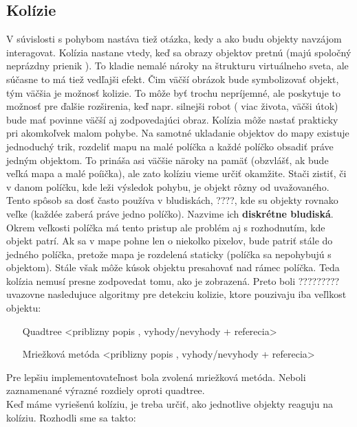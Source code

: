 \subsection{Kolízie}
V súvislosti s pohybom nastáva tiež otázka, kedy a ako budu objekty navzájom interagovat. Kolízia nastane vtedy, keď sa obrazy objektov pretnú (majú spoločný neprázdny prienik ). To kladie nemalé nároky na štrukturu virtuálneho sveta, ale súčasne  to má tiež vedľajši efekt. Čim väčší obrázok bude symbolizovať objekt, tým väčšia je možnosť kolizie. To môže byť trochu nepríjemné, ale poskytuje to možnosť pre ďalšie rozširenia, keď napr. silnejši robot ( viac života, väčši útok) bude mať povinne väčší aj zodpovedajúci obraz. Kolízia môže nastať prakticky pri akomkoľvek malom pohybe. Na samotné ukladanie objektov do mapy existuje jednoduchý trik, rozdeliť mapu na malé políčka a každé políčko obsadiť práve jedným objektom. To prináša asi väčšie näroky na pamäť (obzvlášť, ak bude veľká mapa a malé poíička), ale zato kolíziu vieme určiť okamžite. Stači zistiť, či v danom políčku, kde leži výsledok pohybu, je objekt rôzny od uvažovaného. Tento spôsob sa dosť často používa v bludiskách, %
????, kde su objekty rovnako veľke (každée zaberá práve jedno políčko). Nazvime ich {\bf diskrétne bludiská}. Okrem veľkosti políčka má tento pristup ale problém aj s rozhodnutím, kde objekt patrí. Ak sa v mape pohne len o niekolko pixelov, bude patriť stále do jedného políčka, pretože mapa je rozdelená staticky (políčka sa nepohybujú s objektom). Stále však môže kúsok objektu presahovať nad rámec políčka. Teda kolízia nemusí presne zodpovedat tomu, ako je zobrazená. Preto boli ?????????uvazovne nasledujuce algoritmy pre detekciu kolizie, ktore pouzivaju iba veľlkost objektu:
\begin{itemize} %
\item[Quadtree]
<priblizny popis , vyhody/nevyhody + referecia>
\item[Mriežková metóda]
<priblizny popis , vyhody/nevyhody + referecia>
\end{itemize}
Pre lepšiu implementovateľnost bola zvolená mriežková metóda. Neboli zaznamenané výrazné rozdiely oproti quadtree.\\
Keď máme vyriešenú kolíziu, je treba určiť, ako jednotlive objekty reaguju na kolíziu. Rozhodli sme sa takto:
